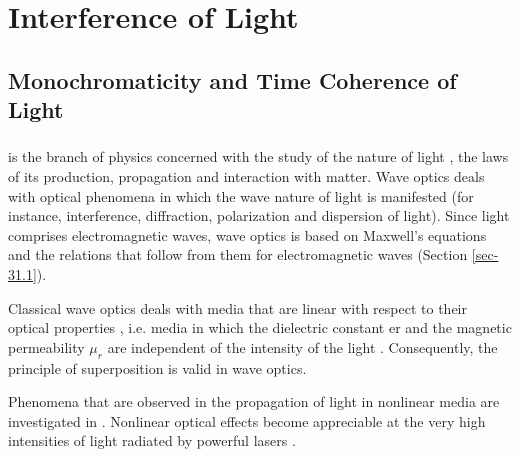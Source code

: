 





\chapter{Interference of Light}
\label{ch-32}

\section{Monochromaticity and Time Coherence of Light}
\label{sec-32.1} 

\subsection{}\label{32.1.1}  is the branch of physics concerned with the study of the nature of light , the laws of its production, propagation
and interaction with matter. Wave optics deals with optical
phenomena in which the wave nature of light is manifested
(for instance, interference, diffraction, polarization and dispersion of light). Since light comprises electromagnetic waves, wave optics is based on Maxwell's equations  and the relations that follow from them for electromagnetic waves (Section \ref{sec-31.1}).

Classical wave optics deals with media that are linear with
respect to their optical properties , i.e. media in which the dielectric constant er and the magnetic permeability $\mu_{r}$ are independent of the intensity of the light . Consequently, the principle of superposition  is valid in wave optics.

Phenomena that are observed in the propagation of light in
nonlinear media are investigated in . Nonlinear optical effects become appreciable at the very high intensities of light radiated by powerful lasers .

